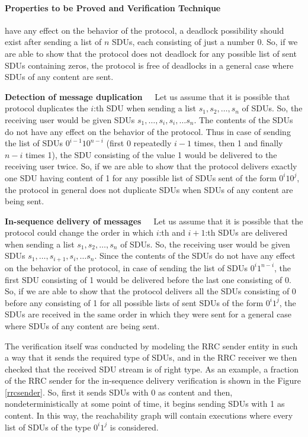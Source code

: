 \documentclass{entcs} \usepackage{entcsmacro}
\begin{document}
\paragraph{Properties to be Proved and Verification Technique}
have any effect on the behavior of the protocol, a deadlock possibility
should exist after sending a list of $n$ SDUs, each consisting of just
a number 0. So, if we are able to show that the protocol does not deadlock
for any possible list of sent SDUs containing zeros, the protocol is free
of deadlocks in a general case where SDUs of any content are sent.

{\bf Detection of message duplication~~}
Let us assume that it is possible that protocol duplicates the $i$:th
SDU when sending a list $s_1,s_2,\ldots, s_n$ of SDUs. So, the
receiving user would be given SDUs $s_1,\ldots, s_i, s_i, \ldots s_n$.
The contents of the SDUs do not have any effect on the behavior of the
protocol. Thus in case of sending the list of SDUs $0^{i-1} 1 0^{n-i}$
(first 0 repeatedly $i-1$ times, then 1 and finally $n-i$ times 1),
the SDU consisting of the value 1 would be delivered to the receiving
user twice.  So, if we are able to show that the protocol delivers
exactly one SDU having content of 1 for any possible list of SDUs sent
of the form $0^i10^j$, the protocol in general does not duplicate SDUs
when SDUs of any content are being sent.

{\bf In-sequence delivery of messages~~}
Let us assume that it is possible that the protocol could change the
order in which $i$:th and $i+1$:th SDUs are delivered when sending a
list $s_1,s_2,\ldots, s_n$ of SDUs. So, the receiving user would be
given SDUs $s_1,\ldots, s_{i+1}, s_i, \ldots s_n$.  Since the contents
of the SDUs do not have any effect on the behavior of the protocol, in
case of sending the list of SDUs $0^{i}1^{n-i}$, the first SDU
consisting of 1 would be delivered before the last one consisting of
$0$.  So, if we are able to show that the protocol delivers all the
SDUs consisting of 0 before any consisting of 1 for all possible lists
of sent SDUs of the form $0^i1^j$, the SDUs are received in the same
order in which they were sent for a general case where SDUs of any
content are being sent.

The verification itself was conducted by modeling the RRC sender
entity in such a way that it sends the required type of SDUs, and in
the RRC receiver we then checked that the received SDU stream is of
right type.  As an example, a fraction of the RRC sender for the
in-sequence delivery verification is shown in the Figure
\ref{rrcsender}. So, first it sends SDUs with 0 as content and then,
nondeterministically at some point of time, it begins sending SDUs
with 1 as content. In this way, the reachability graph will contain
executions where every list of SDUs of the type $0^i1^j$ is
considered.
\end{document}

